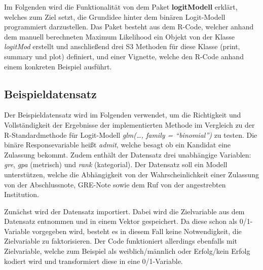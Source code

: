 \documentclass[12pt,]{article}
\newenvironment{Shaded}{\begin{snugshade}}{\end{snugshade}}
\newcommand{\KeywordTok}[1]{\textcolor[rgb]{0.13,0.29,0.53}{\textbf{#1}}}
\newcommand{\DataTypeTok}[1]{\textcolor[rgb]{0.13,0.29,0.53}{#1}}
\newcommand{\DecValTok}[1]{\textcolor[rgb]{0.00,0.00,0.81}{#1}}
\newcommand{\StringTok}[1]{\textcolor[rgb]{0.31,0.60,0.02}{#1}}
\newcommand{\CommentTok}[1]{\textcolor[rgb]{0.56,0.35,0.01}{\textit{#1}}}
\newcommand{\ControlFlowTok}[1]{\textcolor[rgb]{0.13,0.29,0.53}{\textbf{#1}}}
\newcommand{\OperatorTok}[1]{\textcolor[rgb]{0.81,0.36,0.00}{\textbf{#1}}}
\newcommand{\NormalTok}[1]{#1}
\begin{document}
Im Folgenden wird die Funktionalität von dem Paket \textbf{logitModell}
erklärt, welches zum Ziel setzt, die Grundidee hinter dem binären
Logit-Modell programmiert darzustellen. Das Paket besteht aus dem
R-Code, welcher anhand dem manuell berechneten Maximum Likelihood ein
Objekt von der Klasse \emph{logitMod} erstellt und anschließend drei S3
Methoden für diese Klasse (print, summary und plot) definiert, und einer
Vignette, welche den R-Code anhand einem konkreten Beispiel ausführt.

\subsection{Beispieldatensatz}\label{beispieldatensatz}

Der Beispieldatensatz wird im Folgenden verwendet, um die Richtigkeit
und Vollständigkeit der Ergebnisse der implementierten Methode im
Vergleich zu der R-Standardmethode für Logit-Modell \emph{glm(\ldots{},
family = ``binomial'')} zu testen. Die binäre Responsevariable heißt
\emph{admit}, welche besagt ob ein Kandidat eine Zulassung bekommt.
Zudem enthält der Datensatz drei unabhängige Variablen: \emph{gre},
\emph{gpa} (metrisch) und \emph{rank} (kategorial). Der Datensatz soll
ein Modell unterstützen, welche die Abhängigkeit von der
Wahrscheinlichkeit einer Zulassung von der Abschlussnote, GRE-Note sowie
dem Ruf von der angestrebten Institution.

Zunächst wird der Datensatz importiert. Dabei wird die Zielvariable aus
dem Datensatz entnommen und in einem Vektor gespeichert. Da diese schon
als 0/1-Variable vorgegeben wird, besteht es in diesem Fall keine
Notwendigkeit, die Zielvariable zu faktorisieren. Der Code funktioniert
allerdings ebenfalls mit Zielvariable, welche zum Beispiel als
weiblich/männlich oder Erfolg/kein Erfolg kodiert wird und transformiert
diese in eine 0/1-Variable.

\begin{Shaded}
\end{Shaded}
\end{document}

